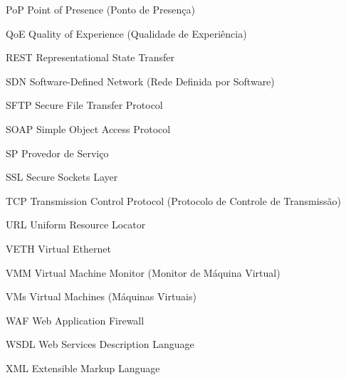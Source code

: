 \begin{siglas}
\item[PoP] Point of Presence (Ponto de Presença) 
\item[QoE] Quality of Experience (Qualidade de Experiência) 
\item[REST] Representational State Transfer 
\item[SDN] Software-Defined Network (Rede Definida por Software) 
\item[SFTP] Secure File Transfer Protocol 
\item[SOAP] Simple Object Access Protocol 
\item[SP] Provedor de Serviço 
\item[SSL] Secure Sockets Layer 
\item[TCP] Transmission Control Protocol (Protocolo de Controle de Transmissão) 
\item[URL] Uniform Resource Locator 
\item[VETH] Virtual Ethernet 
\item[VMM] Virtual Machine Monitor (Monitor de Máquina Virtual) 
\item[VMs] Virtual Machines (Máquinas Virtuais) 
\item[WAF] Web Application Firewall 
\item[WSDL] Web Services Description Language 
\item[XML] Extensible Markup Language
\end{siglas}




